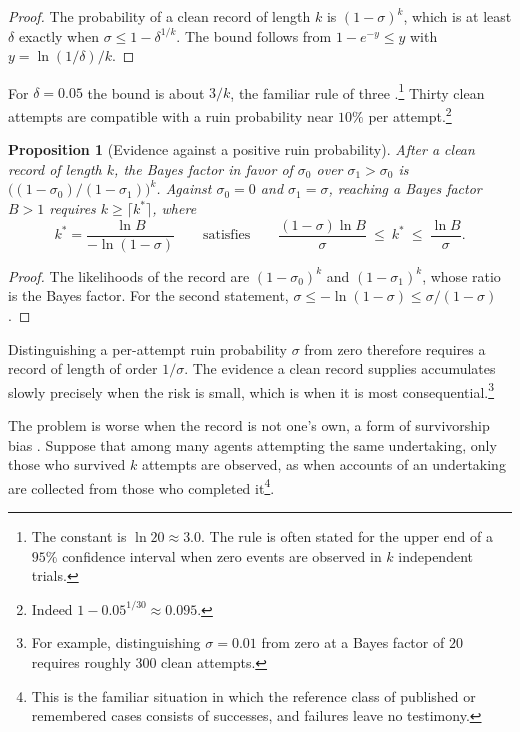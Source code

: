 \documentclass[11pt]{article}
\newtheorem{proposition}{Proposition}
\theoremstyle{remark}
\begin{document}
\begin{proof}
The probability of a clean record of length $k$ is $(1-\sigma)^k$, which is at least $\delta$ exactly when $\sigma\le1-\delta^{1/k}$. The bound follows from $1-e^{-y}\le y$ with $y=\ln(1/\delta)/k$.
\end{proof}

For $\delta=0.05$ the bound is about $3/k$, the familiar rule of three \cite{hanley}.\footnote{The constant is $\ln20\approx3.0$. The rule is often stated for the upper end of a $95\%$ confidence interval when zero events are observed in $k$ independent trials.} Thirty clean attempts are compatible with a ruin probability near $10\%$ per attempt.\footnote{Indeed $1-0.05^{1/30}\approx0.095$.}

\begin{proposition}[Evidence against a positive ruin probability]
After a clean record of length $k$, the Bayes factor in favor of $\sigma_0$ over $\sigma_1>\sigma_0$ is $\bigl((1-\sigma_0)/(1-\sigma_1)\bigr)^k$. Against $\sigma_0=0$ and $\sigma_1=\sigma$, reaching a Bayes factor $B>1$ requires $k\ge\lceil k^\ast\rceil$, where
\[
k^\ast=\frac{\ln B}{-\ln(1-\sigma)}\qquad\text{satisfies}\qquad \frac{(1-\sigma)\ln B}{\sigma}\ \le\ k^\ast\ \le\ \frac{\ln B}{\sigma}.
\]
\end{proposition}

\begin{proof}
The likelihoods of the record are $(1-\sigma_0)^k$ and $(1-\sigma_1)^k$, whose ratio is the Bayes factor. For the second statement, $\sigma\le-\ln(1-\sigma)\le\sigma/(1-\sigma)$.
\end{proof}

Distinguishing a per-attempt ruin probability $\sigma$ from zero therefore requires a record of length of order $1/\sigma$. The evidence a clean record supplies accumulates slowly precisely when the risk is small, which is when it is most consequential.\footnote{For example, distinguishing $\sigma=0.01$ from zero at a Bayes factor of $20$ requires roughly $300$ clean attempts.}

The problem is worse when the record is not one's own, a form of survivorship bias \cite{brown}. Suppose that among many agents attempting the same undertaking, only those who survived $k$ attempts are observed, as when accounts of an undertaking are collected from those who completed it\footnote{This is the familiar situation in which the reference class of published or remembered cases consists of successes, and failures leave no testimony.}.
\end{document}

